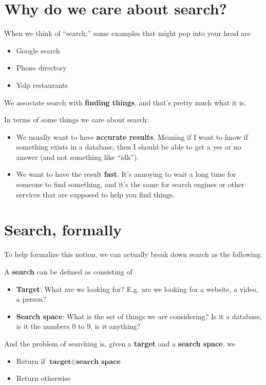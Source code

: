 \documentclass{article}
\begin{document}
\maketitle

\section{Why do we care about search?}

When we think of ``search,'' some examples that might pop into your head are 
\begin{itemize}
    \item Google search
    \item Phone directory
    \item Yelp restaurants
\end{itemize}

We associate search with \textbf{finding things}, and that's pretty much what it is.

In terms of some things we care about search: 
\begin{itemize}
    \item We usually want to have \textbf{accurate results}. Meaning if I want to know if something exists in a database, then I should be able to get a yes or no answer (and not something like ``idk'').
    \item We want to have the result \textbf{fast}. It's annoying to wait a long time for someone to find something, and it's the same for search engines or other services that are supposed to help you find things.
\end{itemize}

\section{Search, formally}

To help formalize this notion, we can actually break down search as the following.

\begin{definition}
    A \textbf{search} can be defined as consisting of 
    \begin{itemize}
        \item \textbf{Target}: What are we looking for? E.g. are we looking for a website, a video, a person?
        \item \textbf{Search space}: What is the set of things we are considering? Is it a database, is it the numbers 0 to 9, is it anything?
    \end{itemize}
    And the problem of searching is, given a \textbf{target} and a \textbf{search space}, we 
    \begin{itemize}
        \item Return  if $\textbf{target} \in \textbf{search space}$
        \item Return  otherwise
    \end{itemize}
\end{definition}
\end{document}
